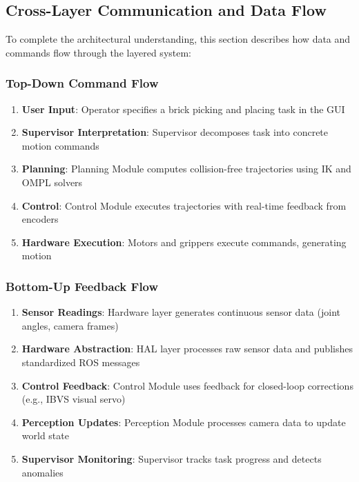 \subsection{Cross-Layer Communication and Data Flow}
\label{subsec:cross_layer_communication}

To complete the architectural understanding, this section describes how data and commands flow through the layered system:

\subsubsection{Top-Down Command Flow}
\begin{enumerate}
    \item \textbf{User Input}: Operator specifies a brick picking and placing task in the GUI
    \item \textbf{Supervisor Interpretation}: Supervisor decomposes task into concrete motion commands
    \item \textbf{Planning}: Planning Module computes collision-free trajectories using IK and OMPL solvers
    \item \textbf{Control}: Control Module executes trajectories with real-time feedback from encoders
    \item \textbf{Hardware Execution}: Motors and grippers execute commands, generating motion
\end{enumerate}

\subsubsection{Bottom-Up Feedback Flow}
\begin{enumerate}
    \item \textbf{Sensor Readings}: Hardware layer generates continuous sensor data (joint angles, camera frames)
    \item \textbf{Hardware Abstraction}: HAL layer processes raw sensor data and publishes standardized ROS messages
    \item \textbf{Control Feedback}: Control Module uses feedback for closed-loop corrections (e.g., IBVS visual servo)
    \item \textbf{Perception Updates}: Perception Module processes camera data to update world state
    \item \textbf{Supervisor Monitoring}: Supervisor tracks task progress and detects anomalies
\end{enumerate}

